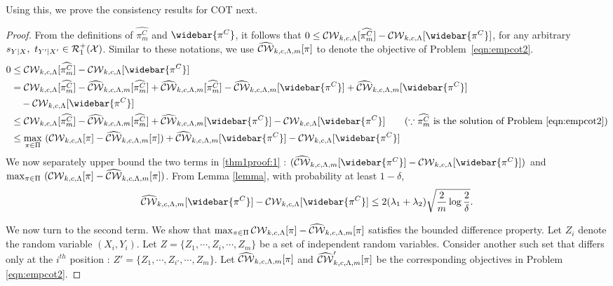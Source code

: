 \noindent Using this, we prove the consistency results for COT next.
\theoremcons*
\begin{proof}
From the definitions of $\widehat{\pi^C_m}$ and $\widebar{\pi^C}$, it follows that $0 \leq \calCW[\widehat{\pi^C_m}]-\calCW[\widebar{\pi^C}]$, for any arbitrary $s_{Y|X},\ t_{Y'|X'}\in \mathcal{R}_1^+(\mathcal{X})$. Similar to these notations, we use $\widehat{\mathcal{CW}}_{k, c, \Lambda, m}[\pi]$ to denote the objective of Problem~\ref{eqn:empcot2}.
\begin{align}
0& \leq  \calCW[\widehat{\pi^C_m}]-\calCW[\widebar{\pi^C}]\nonumber\\
& = \calCW[\widehat{\pi^C_m}]-\widehatcalCWm[\widehat{\pi^C_m}]+\widehatcalCWm[\widehat{\pi^C_m}] - \widehatcalCWm[\widebar{\pi^C}] + \widehatcalCWm[\widebar{\pi^C}] \nonumber\\
& \quad - \calCW[\widebar{\pi^C}] \nonumber \\
& \leq \calCW[\widehat{\pi^C_m}]-\widehatcalCWm[\widehat{\pi^C_m}]+ \widehatcalCWm[\widebar{\pi^C}] - \calCW[\widebar{\pi^C}] \tag{$\because \widehat{\pi^C_m}$  is the solution of Problem~\ref{eqn:empcot2}} \nonumber \\ 
& \leq \max_{\pi\in\Pi} \ (\calCW[\pi]-\widehatcalCWm[\pi])+ \widehatcalCWm[\widebar{\pi^C}] - \calCW[\widebar{\pi^C}] \label{thm1proof:1}
\end{align}
We now separately upper bound the two terms in \ref{thm1proof:1} : $(\widehatcalCWm[\widebar{\pi^C}] - \calCW[\widebar{\pi^C}])$ and $\max_{\pi\in\Pi} \ (\calCW[\pi]-\widehatcalCWm[\pi])$.
From Lemma \ref{lemma}, with probability at least $1-\delta$,
\begin{align} \label{thm1:1.1}
    \widehatcalCWm[\widebar{\pi^C}] - \calCW[\widebar{\pi^C}] \leq 2(\lambda_1+\lambda_2)\sqrt{\frac{2}{m}\log{\frac{2}{\delta}}}.
\end{align}

We now turn to the second term. We show that $\max_{\pi\in\Pi} \mathcal{CW}_{k, c, \Lambda}[\pi]-\widehat{\mathcal{CW}}_{k, c, \Lambda, m}[\pi]$ satisfies the bounded difference property. Let $Z_i$ denote the random variable $(X_i, Y_i)$. Let $Z=\{Z_1, \cdots, Z_i, \cdots, Z_m\}$ be a set of independent random variables. Consider another such set that differs only at the $i^{th}$ position : $Z'=\{Z_1, \cdots, Z_{i'}, \cdots, Z_m\}$. Let $\widehat{\mathcal{CW}}_{k, c, \Lambda, m}[\pi]$ and $\widehat{\mathcal{CW}}_{k, c, \Lambda, m}'[\pi]$ be the corresponding objectives in Problem \ref{eqn:empcot2}.


\end{proof}
